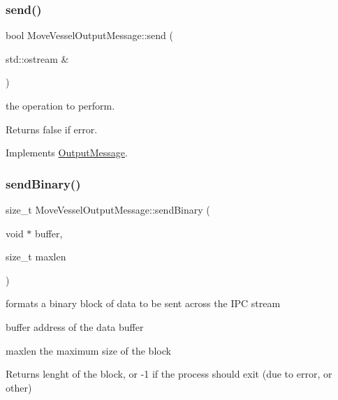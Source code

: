 \mbox{\label{class_move_vessel_output_message_a3b538a1080de230361cb875d7617c947}} 
\subsubsection{\texorpdfstring{send()}{send()}}
{\footnotesize\ttfamily bool Move\+Vessel\+Output\+Message\+::send (\begin{DoxyParamCaption}\item[{std\+::ostream \&}]{ }\end{DoxyParamCaption})\hspace{0.3cm}{\ttfamily [virtual]}}



the operation to perform. 

\begin{DoxyReturn}{Returns}
false if error. 
\end{DoxyReturn}


Implements \mbox{\hyperlink{class_output_message_a6f817de4d3430dc98521431385b95328}{Output\+Message}}.

\mbox{\label{class_move_vessel_output_message_adad3c956721e3470a6b8e5a35e8aac86}} 
\subsubsection{\texorpdfstring{sendBinary()}{sendBinary()}}
{\footnotesize\ttfamily size\+\_\+t Move\+Vessel\+Output\+Message\+::send\+Binary (\begin{DoxyParamCaption}\item[{void $\ast$}]{buffer,  }\item[{size\+\_\+t}]{maxlen }\end{DoxyParamCaption})\hspace{0.3cm}{\ttfamily [virtual]}}



formats a binary block of data to be sent across the I\+PC stream 

\begin{DoxyItemize}
\item buffer address of the data buffer \item maxlen the maximum size of the block \begin{DoxyReturn}{Returns}
lenght of the block, or -\/1 if the process should exit (due to error, or other) 
\end{DoxyReturn}
\end{DoxyItemize}


